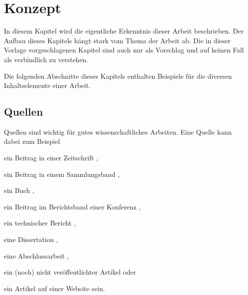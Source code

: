 
\chapter{Konzept}
\label{chapter-konzept}

In diesem Kapitel wird die eigentliche Erkenntnis dieser Arbeit beschrieben. Der Aufbau dieses Kapitels hängt stark vom Thema der Arbeit ab. Die in dieser Vorlage vorgeschlagenen Kapitel sind auch nur als Vorschlag und auf keinen Fall als verbindlich zu verstehen.

Die folgenden Abschnitte dieses Kapitels enthalten Beispiele für die diversen Inhaltselemente einer Arbeit.




\section{Quellen}

Quellen sind wichtig für gutes wissenschaftliches Arbeiten. Eine Quelle kann dabei zum Beispiel
\begin{compactitem}
  \item ein Beitrag in einer Zeitschrift \cite{MopOverview},
  \item ein Beitrag in einem Sammlungsband \cite{moore},
  \item ein Buch \cite{scala},
  \item ein Beitrag im Berichtsband einer Konferenz \cite{rltl},
  \item ein technischer Bericht \cite{bitkom},
  \item eine Dissertation \cite{Leucker02},
  \item eine Abschlussarbeit \cite{RltlConv},
  \item ein (noch) nicht veröffentlichter Artikel \cite{ptLTL} oder
  \item ein Artikel auf einer Website \cite{codecommit} sein.
\end{compactitem}

